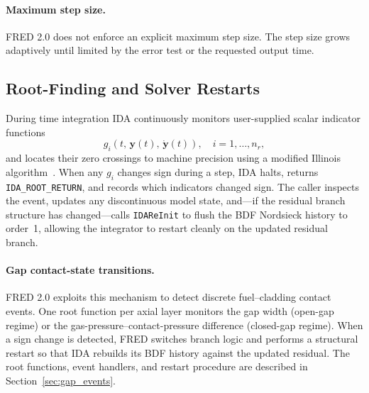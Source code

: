\begin{refsection}
\paragraph{Maximum step size.} FRED 2.0 does not enforce an explicit maximum step size.  The step size grows adaptively until limited by the error test or the requested output time.

\subsection{Root-Finding and Solver Restarts}
\label{sec:root_finding}

During time integration IDA continuously monitors user-supplied scalar indicator functions
\begin{equation}
  g_i\!\left(t,\,\mathbf{y}(t),\,\dot{\mathbf{y}}(t)\right), \quad i = 1,\ldots,n_r,
  \label{eq:root_fns}
\end{equation}
and locates their zero crossings to machine precision using a modified Illinois algorithm~\cite{hindmarsh2005}. When any $g_i$ changes sign during a step, IDA halts, returns \texttt{IDA\_ROOT\_RETURN}, and records which indicators changed sign. The caller inspects the event, updates any discontinuous model state, and---if the residual branch structure has changed---calls \texttt{IDAReInit} to flush the BDF Nordsieck history to order~1, allowing the integrator to restart cleanly on the updated residual branch.

\paragraph{Gap contact-state transitions.} FRED 2.0 exploits this mechanism to detect discrete fuel--cladding contact events. One root function per axial layer monitors the gap width (open-gap regime) or the gas-pressure--contact-pressure difference (closed-gap regime). When a sign change is detected, FRED switches branch logic and performs a structural restart so that IDA rebuilds its BDF history against the updated residual. The root functions, event handlers, and restart procedure are described in Section~\ref{sec:gap_events}.


\end{refsection}

